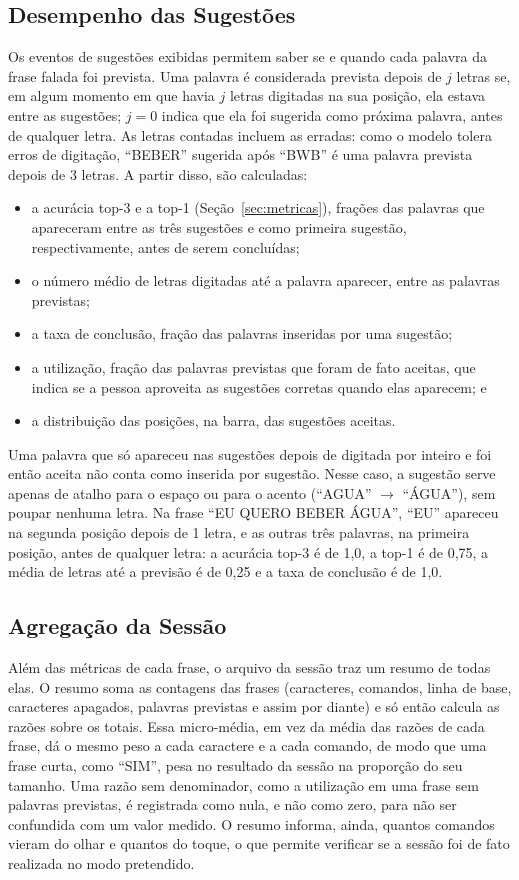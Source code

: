 \subsection{Desempenho das Sugestões} \label{sec:met_desempenho_sugestoes}

Os eventos de sugestões exibidas permitem saber se e quando cada palavra da frase falada foi prevista. Uma palavra é considerada prevista depois de $j$ letras se, em algum momento em que havia $j$ letras digitadas na sua posição, ela estava entre as sugestões; $j = 0$ indica que ela foi sugerida como próxima palavra, antes de qualquer letra. As letras contadas incluem as erradas: como o modelo tolera erros de digitação, ``BEBER'' sugerida após ``BWB'' é uma palavra prevista depois de 3 letras. A partir disso, são calculadas:
\begin{itemize}
    \item a acurácia top-3 e a top-1 (Seção~\ref{sec:metricas}), frações das palavras que apareceram entre as três sugestões e como primeira sugestão, respectivamente, antes de serem concluídas;
    \item o número médio de letras digitadas até a palavra aparecer, entre as palavras previstas;
    \item a taxa de conclusão, fração das palavras inseridas por uma sugestão;
    \item a utilização, fração das palavras previstas que foram de fato aceitas, que indica se a pessoa aproveita as sugestões corretas quando elas aparecem; e
    \item a distribuição das posições, na barra, das sugestões aceitas.
\end{itemize}
Uma palavra que só apareceu nas sugestões depois de digitada por inteiro e foi então aceita não conta como inserida por sugestão. Nesse caso, a sugestão serve apenas de atalho para o espaço ou para o acento (``AGUA'' $\to$ ``ÁGUA''), sem poupar nenhuma letra. Na frase ``EU QUERO BEBER ÁGUA'', ``EU'' apareceu na segunda posição depois de 1 letra, e as outras três palavras, na primeira posição, antes de qualquer letra: a acurácia top-3 é de 1,0, a top-1 é de 0,75, a média de letras até a previsão é de 0,25 e a taxa de conclusão é de 1,0.

\subsection{Agregação da Sessão} \label{sec:met_agregacao}

Além das métricas de cada frase, o arquivo da sessão traz um resumo de todas elas. O resumo soma as contagens das frases (caracteres, comandos, linha de base, caracteres apagados, palavras previstas e assim por diante) e só então calcula as razões sobre os totais. Essa micro-média, em vez da média das razões de cada frase, dá o mesmo peso a cada caractere e a cada comando, de modo que uma frase curta, como ``SIM'', pesa no resultado da sessão na proporção do seu tamanho. Uma razão sem denominador, como a utilização em uma frase sem palavras previstas, é registrada como nula, e não como zero, para não ser confundida com um valor medido. O resumo informa, ainda, quantos comandos vieram do olhar e quantos do toque, o que permite verificar se a sessão foi de fato realizada no modo pretendido.

